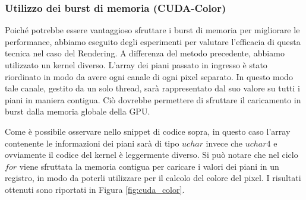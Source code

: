 \subsubsection{Utilizzo dei burst di memoria (CUDA-Color)}
Poiché potrebbe essere vantaggioso sfruttare i burst di memoria per migliorare le performance, abbiamo eseguito degli esperimenti per valutare l'efficacia di questa tecnica nel caso del Rendering.
A differenza del metodo precedente, abbiamo utilizzato un kernel diverso. L'array dei piani passato in ingresso è stato riordinato in modo da avere ogni canale di ogni pixel separato.
In questo modo tale canale, gestito da un solo thread, sarà rappresentato dal suo valore su tutti i piani in maniera contigua.
Ciò dovrebbe permettere di sfruttare il caricamento in burst dalla memoria globale della GPU.

Come è possibile osservare nello snippet di codice sopra, in questo caso l'array contenente le informazioni dei piani sarà di tipo $uchar$ invece che $uchar4$ e ovviamente il codice del kernel è leggermente diverso.
Si può notare che nel ciclo $for$ viene sfruttata la memoria contigua per caricare i valori dei piani in un registro, in modo da poterli utilizzare per il calcolo del colore del pixel.
I risultati ottenuti sono riportati in Figura \ref{fig:cuda_color}.
